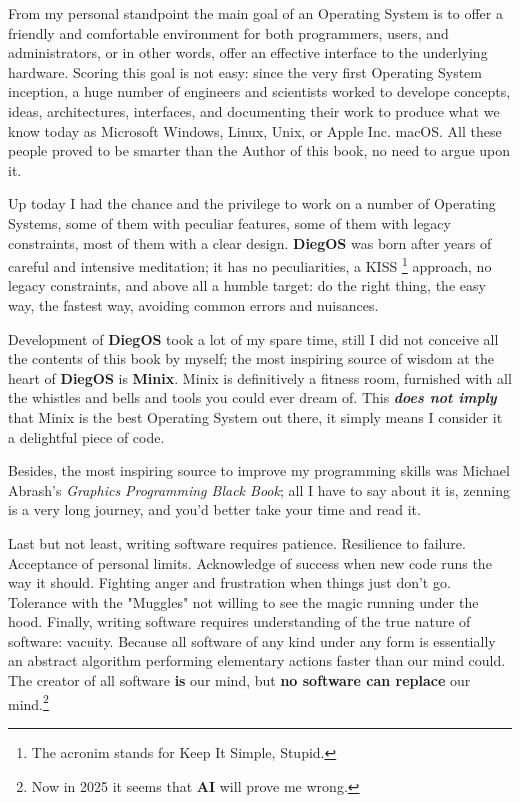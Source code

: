 \documentclass[11pt,b5paper]{scrbook}
\newcommand{\myOS}{{\color{SteelBlue}\textbf{DiegOS}}}
\begin{document}
From my personal standpoint the main goal of an Operating System is to offer a 
friendly and comfortable environment for both programmers, users, and administrators,
or in other words, offer an effective interface to the underlying hardware.
Scoring this goal is not easy: since the very first Operating System inception, a huge number of engineers 
and scientists worked to develope concepts, ideas, architectures, interfaces, and documenting 
their work to produce what we know today as Microsoft Windows, Linux, Unix, or Apple Inc. macOS.
All these people proved to be smarter than the Author of this book, no need to
argue upon it.

Up today I had the chance and the privilege to work on a number of Operating Systems,
some of them with peculiar features, some of them with legacy constraints, most of
them with a clear design.
{\myOS} was born after years of careful and intensive meditation; it has no peculiarities,
a KISS \footnote{The acronim stands for Keep It Simple, Stupid.} approach, no legacy constraints, and above all a humble
target: do the right thing, the easy way, the fastest way, avoiding common errors and nuisances.

Development of {\myOS} took a lot of my spare time, still I did not conceive all the contents of this book by myself;
the most inspiring source of wisdom at the heart of
{\myOS} is \textbf{Minix}.
Minix is definitively a fitness room, furnished with all the whistles and bells and tools you could ever dream of.
This \textbf{\emph{does not imply}} that Minix is the best Operating System out there, 
it simply means I consider it a delightful piece of code.

Besides, the most inspiring source to improve my programming skills was
Michael Abrash's \emph{Graphics Programming Black Book};
all I have to say about it is, zenning is a very long journey, and you'd better take your time and read it.

Last but not least, writing software requires patience. Resilience to failure. Acceptance of personal limits.
Acknowledge of success when new code runs the way it should.
Fighting anger and frustration when things just don't go.
Tolerance with the "Muggles" not willing to see the magic running under the hood.
Finally, writing software requires understanding of the true nature of software: vacuity.
Because all software of any kind under any form is
essentially an abstract algorithm performing elementary actions faster than
our mind could.
The creator of all software \textbf{is} our mind, but \textbf{no software can replace} our mind.\footnote{Now in 2025 it seems that \textbf{AI} will prove me wrong.}
\end{document}
